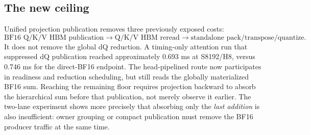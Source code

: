 \subsection{The new ceiling}

Unified projection publication removes three previously exposed costs:
\begin{equation}
  \text{BF16 Q/K/V HBM publication}
  \rightarrow
  \text{Q/K/V HBM reread}
  \rightarrow
  \text{standalone pack/transpose/quantize}.
  \label{eq:removed-qk-roundtrip}
\end{equation}
It does not remove the global dQ reduction.  A timing-only attention run that
suppressed dQ publication reached approximately 0.693 ms at S8192/H8, versus
0.746 ms for the direct-BF16 endpoint.  The head-pipelined route now
participates in readiness and reduction scheduling, but still reads the
globally materialized BF16 sum.  Reaching the remaining floor requires
projection backward to absorb the hierarchical sum before that publication,
not merely observe it earlier.  The two-lane experiment shows more precisely
that absorbing only the \emph{last addition} is also insufficient: owner
grouping or compact publication must remove the BF16 producer traffic at the
same time.
